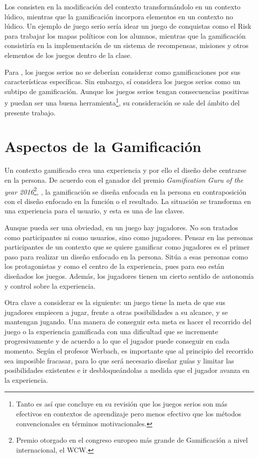 Los  consisten en la modificación del contexto transformándolo en un contexto lúdico\cite{MetaSerious}, mientras que la gamificación incorpora elementos en un contexto no lúdico.
%
Un ejemplo de juego serio sería idear un juego de conquistas como el Risk para trabajar los mapas políticos con los alumnos, mientras que la gamificación consistiría en la implementación de un sistema de recompensas, misiones y otros elementos de los juegos dentro de la clase.

Para \cite{kwerb-WhatIs}, los juegos serios no se deberían considerar como gamificaciones por sus características específicas.
%
Sin embargo, \citep{GamificationDef} sí considera los juegos serios como un subtipo de gamificación.
%
Aunque los juegos serios tengan consecuencias positivas y puedan ser una buena herramienta\footnote{Tanto es así que  \cite{MetaSerious} concluye en su revisión que los juegos serios son más efectivos en contextos de aprendizaje pero menos efectivo que los métodos convencionales en términos motivacionales.}, su consideración se sale del ámbito del presente trabajo.

\section{Aspectos de la Gamificación}

Un contexto gamificado crea una experiencia y por ello el diseño debe centrarse en la persona.
%
De acuerdo con el ganador del premio \textit{Gamification Guru of the year 2016}\footnote{Premio otorgado en el congreso europeo más grande de Gamificación a nivel internacional, el \gls{WCW}.},  \cite{BeyondPBL}, la gamificación se diseña enfocada en la persona en contraposición con el diseño enfocado en la función o el resultado.
%
La situación se transforma en una experiencia para el usuario, y esta es una de las claves.

Aunque pueda ser una obviedad, en un juego hay jugadores. 
%
No son tratados como participantes ni como usuarios, sino como jugadores.
%
Pensar en las personas participantes de un contexto que se quiere gamificar como jugadores es el primer paso para realizar un diseño enfocado en la persona.
%
Sitúa a esas personas como los protagonistas y como el centro de la experiencia, pues para eso están diseñados los juegos.
%
Además, los jugadores tienen un cierto sentido de autonomía y control sobre la experiencia.

Otra clave a considerar es la siguiente: un juego tiene la meta de que sus jugadores empiecen a jugar, frente a otras posibilidades a su alcance, y se mantengan jugando.
%
Una manera de conseguir esta meta es hacer el recorrido del juego o la experiencia gamificada con una dificultad que se incremente progresivamente y de acuerdo a lo que el jugador puede conseguir en cada momento. 
%
Según el profesor Werbach, es importante que al principio del recorrido sea imposible fracasar, para lo que será necesario diseñar guías y limitar las posibilidades existentes e ir desbloqueándolas a medida que el jugador avanza en la experiencia.


